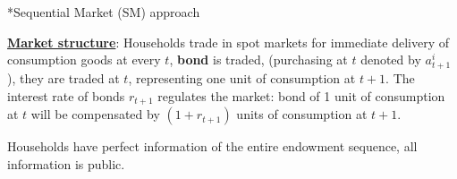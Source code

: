 \documentclass[10pt,landscape,a4paper]{article}
\makeatletter
\let\bar\overline
\renewcommand{\subsection}{\@startsection{subsection}{1}{0mm}{.2ex}{.2ex}{\small\bfseries}}
\makeatother
\begin{document}
\begin{multicols*}{3}
\subsection*{Sequential Market (SM) approach}

\underline{\textbf{\color{myred}Market structure}}: Households trade in spot markets for immediate delivery of consumption goods at every $t$, \textbf{bond} is traded, (purchasing at $t$ denoted by $a^i_{t+1}$), they are traded at $t$, representing one unit of consumption at $t+1$. The interest rate of bonds $r_{t+1}$ regulates the market: bond of 1 unit of consumption at $t$ will be compensated by $(1+r_{t+1})$ units of consumption at $t+1$.
    
Households have perfect information of the entire endowment sequence, all information is public.


\vspace{2pt}


\end{multicols*}
\end{document}
